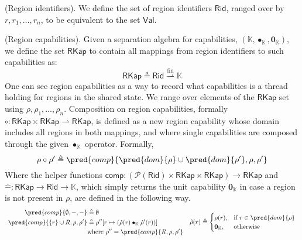  (Region identifiers). We define the set of region identifiers $\mathsf{Rid}$, ranged over by $r, r_1, \ldots, r_n$, to be equivalent to the set $\mathsf{Val}$.

 (Region capabilities). Given a separation algebra for capabilities, $(\mathbb{K}, \bullet_\mathbb{K}, \mathbf{0}_\mathbb{K})$, we define the set $\mathsf{RKap}$ to contain all mappings from region identifiers to such capabilities as:
\[
	\mathsf{RKap} \triangleq \mathsf{Rid} \overset{\text{fin}}{\rightharpoonup} \mathbb{K}
\]
One can see region capabilities as a way to record what capabilities is a thread holding for regions in the shared state. We range over elements of the $\mathsf{RKap}$ set using $\rho, \rho_1, \ldots, \rho_n$. Composition on region capabilities, formally $\circ : \mathsf{RKap} \times \mathsf{RKap} \rightharpoonup \mathsf{RKap}$, is defined as a new region capability whose domain includes all regions in both mappings, and where single capabilities are composed through the given $\bullet_\mathbb{K}$ operator. Formally,
\[
	\rho \circ \rho' \triangleq \pred{comp}{\pred{dom}{\rho} \cup \pred{dom}{\rho'}, \rho, \rho'}
\]
Where the helper functions $\mathsf{comp} : \left( \mathcal{P}(\mathsf{Rid}) \times \mathsf{RKap} \times \mathsf{RKap} \right) \rightarrow \mathsf{RKap}$ and $\hat{-} : \mathsf{RKap} \rightarrow \mathsf{Rid} \rightarrow \mathbb{K}$, which simply returns the unit capability $\mathbf{0}_\mathbb{K}$ in case a region is not present in $\rho$, are defined in the following way.
\[
	\begin{array}{l l}
			\begin{aligned}
				\pred{comp}{\emptyset, -, -} &\triangleq \emptyset \\
				\pred{comp}{\{r\} \cup R, \rho, \rho'} &\triangleq \rho''[r \mapsto (\hat{\rho}(r) \bullet_\mathbb{K} \hat{\rho}'(r))] \\
				&\text{where } \rho'' = \pred{comp}{R, \rho, \rho'}
			\end{aligned}
		&
		\hat{\rho}(r) \triangleq
		\begin{cases}
			\rho(r), & \text{if } r \in \pred{dom}{\rho}
			\\
			\mathbf{0}_\mathbb{K}, & \text{otherwise}
		\end{cases}
	\end{array}
\]


